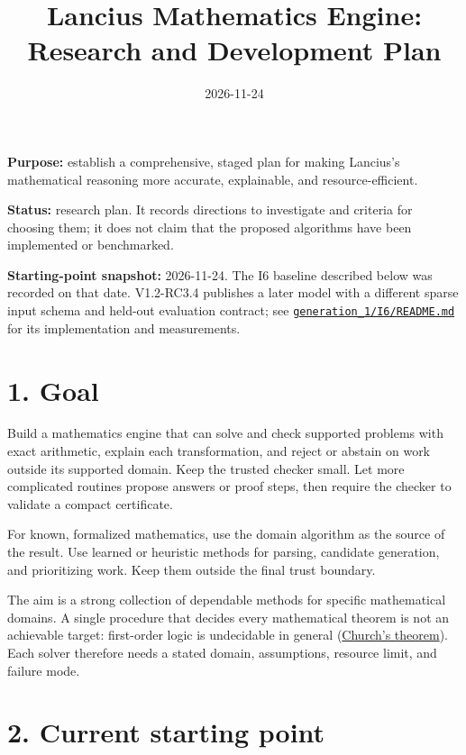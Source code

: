 \documentclass[
  10pt,
]{article}
\title{Lancius Mathematics Engine: Research and Development Plan}
\author{}
\date{2026-11-24}
\let\lanciusOriginalTableOfContents\tableofcontents
\renewcommand{\tableofcontents}{\begingroup\small\lanciusOriginalTableOfContents\endgroup}
\begin{document}
\maketitle

{
\setcounter{tocdepth}{1}
\tableofcontents
}
\clearpage

\textbf{Purpose:} establish a comprehensive, staged plan for making
Lancius's mathematical reasoning more accurate, explainable, and
resource-efficient.

\textbf{Status:} research plan. It records directions to investigate and
criteria for choosing them; it does not claim that the proposed
algorithms have been implemented or benchmarked.

\textbf{Starting-point snapshot:} 2026-11-24. The I6 baseline described
below was recorded on that date. V1.2-RC3.4 publishes a later model with a
different sparse input schema and held-out evaluation contract; see
\href{../generation_1/I6/README.md}{\texttt{generation\_1/I6/README.md}}
for its implementation and measurements.

\section{1. Goal}\label{goal}

Build a mathematics engine that can solve and check supported problems
with exact arithmetic, explain each transformation, and reject or
abstain on work outside its supported domain. Keep the trusted checker
small. Let more complicated routines propose answers or proof steps,
then require the checker to validate a compact certificate.

For known, formalized mathematics, use the domain algorithm as the
source of the result. Use learned or heuristic methods for parsing,
candidate generation, and prioritizing work. Keep them outside the final
trust boundary.

The aim is a strong collection of dependable methods for specific
mathematical domains. A single procedure that decides every mathematical
theorem is not an achievable target: first-order logic is undecidable in
general
(\href{https://plato.stanford.edu/entries/goedel-incompleteness/}{Church's
theorem}). Each solver therefore needs a stated domain, assumptions,
resource limit, and failure mode.

\section{2. Current starting point}\label{current-starting-point}
\end{document}
